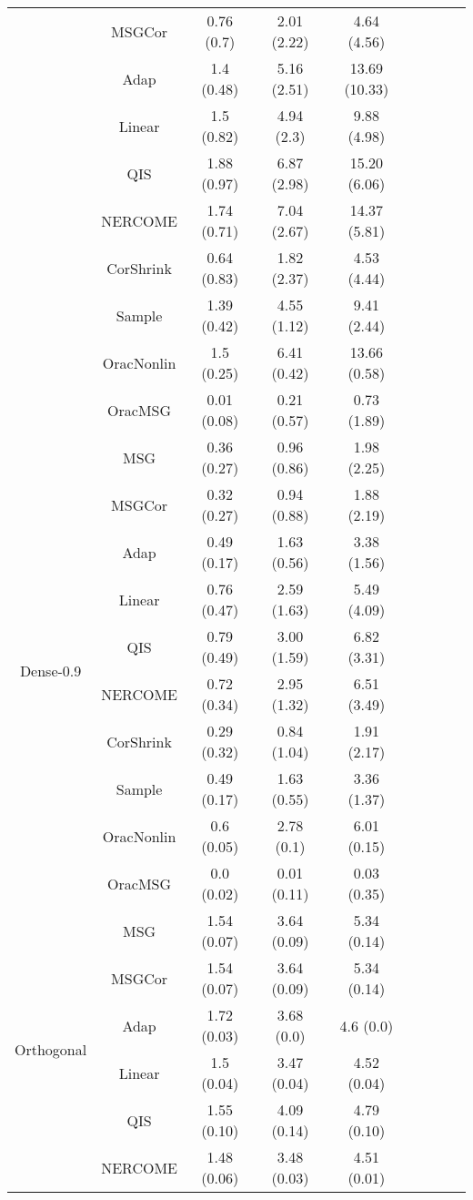 \documentclass{article}
\begin{document}
\begin{table}[H]
{\begin{tabular}{ccccccccc}
 & MSGCor   & 0.76 (0.7)  & 2.01 (2.22) & 4.64 (4.56)   \\
 & Adap     & 1.4 (0.48)  & 5.16 (2.51) & 13.69 (10.33) \\
 & Linear         & 1.5 (0.82)  & 4.94 (2.3)  & 9.88 (4.98)   \\
 & QIS            & 1.88 (0.97) & 6.87 (2.98) & 15.20 (6.06)  \\
 & NERCOME        & 1.74 (0.71) & 7.04 (2.67) & 14.37 (5.81)  \\
 & CorShrink      & 0.64 (0.83) & 1.82 (2.37) & 4.53 (4.44)   \\
 & Sample            & 1.39 (0.42) & 4.55 (1.12) & 9.41 (2.44)   \\
 & OracNonlin & 1.5 (0.25)  & 6.41 (0.42) & 13.66 (0.58)  \\
 & OracMSG  & 0.01 (0.08) & 0.21 (0.57) & 0.73 (1.89) \\ \midrule
\multirow{10}{*}{Dense-0.9}  
 & MSG & 0.36 (0.27) & 0.96 (0.86) & 1.98 (2.25) \\
 & MSGCor   & 0.32 (0.27) & 0.94 (0.88) & 1.88 (2.19) \\
 & Adap     & 0.49 (0.17) & 1.63 (0.56) & 3.38 (1.56) \\
 & Linear         & 0.76 (0.47) & 2.59 (1.63) & 5.49 (4.09) \\
 & QIS            & 0.79 (0.49)  & 3.00 (1.59) & 6.82 (3.31) \\
 & NERCOME        & 0.72 (0.34) & 2.95 (1.32) & 6.51 (3.49) \\
 & CorShrink      & 0.29 (0.32) & 0.84 (1.04) & 1.91 (2.17) \\
 & Sample            & 0.49 (0.17) & 1.63 (0.55) & 3.36 (1.37) \\
 & OracNonlin & 0.6 (0.05)  & 2.78 (0.1)  & 6.01 (0.15) \\
 & OracMSG  & 0.0 (0.02)  & 0.01 (0.11) & 0.03 (0.35) \\ \midrule
\multirow{10}{*}{Orthogonal}  
 & MSG & 1.54 (0.07) & 3.64 (0.09) & 5.34 (0.14)  \\
 & MSGCor   & 1.54 (0.07) & 3.64 (0.09) & 5.34 (0.14)  \\
 & Adap     & 1.72 (0.03) & 3.68 (0.0)  & 4.6 (0.0)    \\
 & Linear         & 1.5 (0.04)  & 3.47 (0.04) & 4.52 (0.04)  \\
 & QIS            & 1.55 (0.10) & 4.09 (0.14) & 4.79 (0.10)  \\
 & NERCOME        & 1.48 (0.06) & 3.48 (0.03) & 4.51 (0.01)  \\

\end{tabular}}
\end{table}
\end{document}
